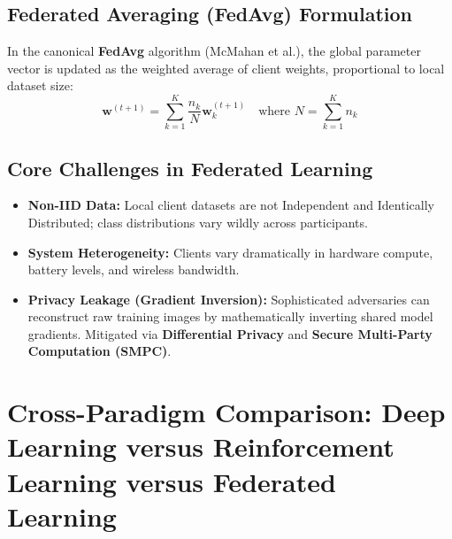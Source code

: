 \subsection{Federated Averaging (FedAvg) Formulation}
In the canonical \textbf{FedAvg} algorithm (McMahan et al.), the global parameter vector is updated as the weighted average of client weights, proportional to local dataset size:
\begin{equation}
\label{eq:fedavg_formula}
\mathbf{w}^{(t+1)} = \sum_{k=1}^K \frac{n_k}{N} \mathbf{w}_k^{(t+1)} \quad \text{where } N = \sum_{k=1}^K n_k
\end{equation}

\subsection{Core Challenges in Federated Learning}
\begin{itemize}
    \item \textbf{Non-IID Data:} Local client datasets are not Independent and Identically Distributed; class distributions vary wildly across participants.
    \item \textbf{System Heterogeneity:} Clients vary dramatically in hardware compute, battery levels, and wireless bandwidth.
    \item \textbf{Privacy Leakage (Gradient Inversion):} Sophisticated adversaries can reconstruct raw training images by mathematically inverting shared model gradients. Mitigated via \textbf{Differential Privacy} and \textbf{Secure Multi-Party Computation (SMPC)}.
\end{itemize}


\section{Cross-Paradigm Comparison: Deep Learning versus Reinforcement Learning versus Federated Learning}
\label{sec:cross_paradigm_comparison}

